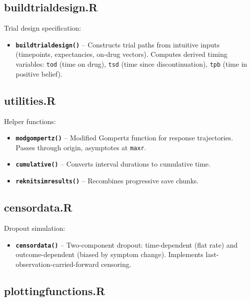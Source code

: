 \documentclass[11pt]{article}
\begin{document}
\subsection{buildtrialdesign.R}

Trial design specification:

\begin{itemize}
  \item \textbf{\texttt{buildtrialdesign()}} -- Constructs trial paths from
    intuitive inputs (timepoints, expectancies, on-drug
    vectors). Computes derived timing variables: \texttt{tod}
    (time on drug), \texttt{tsd} (time since discontinuation),
    \texttt{tpb} (time in positive belief).
\end{itemize}

\subsection{utilities.R}

Helper functions:

\begin{itemize}
  \item \textbf{\texttt{modgompertz()}} -- Modified Gompertz function for
    response trajectories. Passes through origin, asymptotes
    at \texttt{maxr}.
  \item \textbf{\texttt{cumulative()}} -- Converts interval durations to
    cumulative time.
  \item \textbf{\texttt{reknitsimresults()}} -- Recombines progressive save
    chunks.
\end{itemize}

\subsection{censordata.R}

Dropout simulation:

\begin{itemize}
  \item \textbf{\texttt{censordata()}} -- Two-component dropout: time-dependent
    (flat rate) and outcome-dependent (biased by symptom
    change). Implements last-observation-carried-forward
    censoring.
\end{itemize}

\subsection{plottingfunctions.R}
\end{document}
